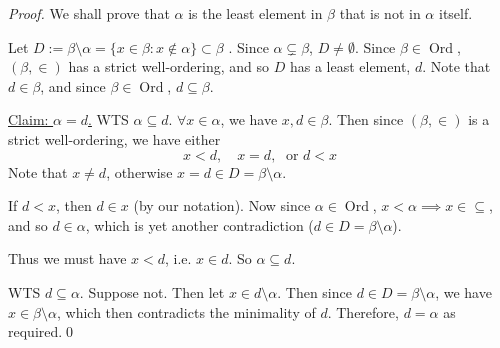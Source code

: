 \documentclass[notoc,notitlepage]{tufte-book}
\DeclareMathOperator{\Ord}{Ord }
\begin{document}
\begin{proof}
  We shall prove that $\alpha$ is the least element in $\beta$ that is not in $\alpha$ itself.

  Let $D := \beta \setminus \alpha = \{ x \in \beta : x \notin \alpha \} \subset \beta$ . Since $\alpha \subsetneq \beta$, $D \neq \emptyset$. Since $\beta \in \Ord$, $(\beta, \in)$ has a strict well-ordering, and so $D$ has a least element, $d$. Note that $d \in \beta$, and since $\beta \in \Ord$, $d \subseteq \beta$.

  \noindent\underline{Claim: $\alpha = d$.} WTS $\alpha \subseteq d$. $\forall x \in \alpha$, we have $x, d \in \beta$. Then since $(\beta, \in)$ is a strict well-ordering, we have either
  \begin{equation*}
    x < d, \quad x = d, \; \text{ or } d < x
  \end{equation*}
  Note that $x \neq d$, otherwise $x = d \in D = \beta \setminus \alpha$.

   If $d < x$, then $d \in x$ (by our notation). Now since $\alpha \in \Ord$, $x < \alpha \implies x \in \subseteq$, and so $d \in \alpha$, which is yet another contradiction ($d \in D = \beta \setminus \alpha$).

    Thus we must have $x < d$, i.e. $x \in d$. So $\alpha \subseteq d$.

    WTS $d \subseteq \alpha$. Suppose not. Then let $x \in d \setminus \alpha$. Then since $d \in D = \beta \setminus \alpha$, we have $x \in \beta \setminus \alpha$, which then contradicts the minimality of $d$. Therefore, $d = \alpha$ as required.\qed
\end{proof}
\end{document}
